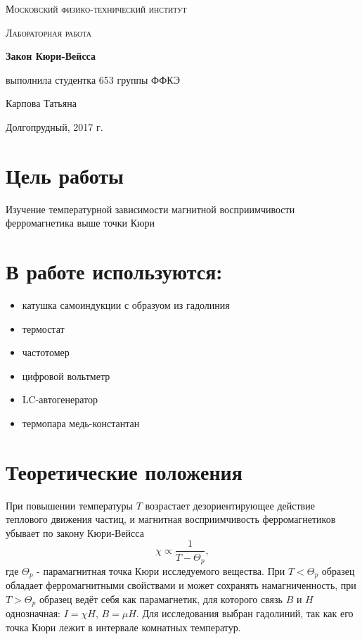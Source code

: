 \documentclass[a4paper]{article}
\begin{document}
\begin{titlepage}
	\centering
	\vspace{5cm}
	{\scshape\LARGE Московский физико-технический институт \par}
	\vspace{4cm}
	{\scshape\Large Лабораторная работа \par}
	\vspace{1cm}
	{\huge\bfseries Закон Кюри-Вейсса \par}
	\vspace{1cm}
	\vfill
\begin{flushright}
	{\large выполнила студентка 653 группы ФФКЭ}\par
	\vspace{0.3cm}
	{\LARGE Карпова Татьяна}
\end{flushright}
	

	\vfill

	Долгопрудный, 2017 г.
\end{titlepage}

\section{Цель работы}
Изучение температурной зависимости магнитной восприимчивости ферромагнетика выше точки Кюри

\section{В работе используются:}
\begin{itemize}
    \item катушка самоиндукции с образуом из гадолиния
    \item термостат
    \item частотомер
    \item цифровой вольтметр
    \item LC-автогенератор
    \item термопара медь-константан
\end{itemize}

\section{Теоретические положения}

При повышении температуры $T$ возрастает дезориентирующее действие теплового движения частиц, и магнитная восприимчивость ферромагнетиков убывает по закону Кюри-Вейсса
\begin{equation}
    \chi \propto \frac{1}{T - \Theta_p},
\end{equation}
где $\Theta_p$ - парамагнитная точка Кюри исследуемого вещества. При $T < \Theta_p$ образец обладает ферромагнитными свойствами и может сохранять намагниченность, при $T > \Theta_p$ образец ведёт себя как парамагнетик, для которого связь $B$ и $H$ однозначная: $I = \chi H$, $B = \mu H$. Для исследования выбран гадолиний, так как его точка Кюри лежит в интервале комнатных температур.
\end{document}
